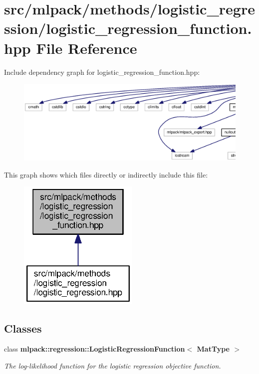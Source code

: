 \section{src/mlpack/methods/logistic\+\_\+regression/logistic\+\_\+regression\+\_\+function.hpp File Reference}
\label{logistic__regression__function_8hpp}
Include dependency graph for logistic\+\_\+regression\+\_\+function.\+hpp\+:
\nopagebreak
\begin{figure}[H]
\begin{center}
\leavevmode
\includegraphics[width=350pt]{logistic__regression__function_8hpp__incl}
\end{center}
\end{figure}
This graph shows which files directly or indirectly include this file\+:
\nopagebreak
\begin{figure}[H]
\begin{center}
\leavevmode
\includegraphics[width=163pt]{logistic__regression__function_8hpp__dep__incl}
\end{center}
\end{figure}
\subsection*{Classes}
\begin{DoxyCompactItemize}
\item 
class {\bf mlpack\+::regression\+::\+Logistic\+Regression\+Function$<$ Mat\+Type $>$}
\begin{DoxyCompactList}\small\item\em The log-\/likelihood function for the logistic regression objective function. \end{DoxyCompactList}\end{DoxyCompactItemize}
